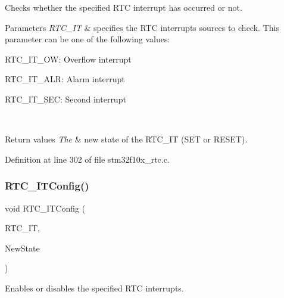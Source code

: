 Checks whether the specified R\+TC interrupt has occurred or not. 


\begin{DoxyParams}{Parameters}
{\em R\+T\+C\+\_\+\+IT} & specifies the R\+TC interrupts sources to check. This parameter can be one of the following values\+: \begin{DoxyItemize}
\item R\+T\+C\+\_\+\+I\+T\+\_\+\+OW\+: Overflow interrupt \item R\+T\+C\+\_\+\+I\+T\+\_\+\+A\+LR\+: Alarm interrupt \item R\+T\+C\+\_\+\+I\+T\+\_\+\+S\+EC\+: Second interrupt \end{DoxyItemize}
\\
\hline
\end{DoxyParams}

\begin{DoxyRetVals}{Return values}
{\em The} & new state of the R\+T\+C\+\_\+\+IT (S\+ET or R\+E\+S\+ET). \\
\hline
\end{DoxyRetVals}


Definition at line 302 of file stm32f10x\+\_\+rtc.\+c.

\mbox{\label{group___r_t_c___private___functions_ga175dfe88866234730c1ec40d2221c4f4}} 
\subsubsection{\texorpdfstring{R\+T\+C\+\_\+\+I\+T\+Config()}{RTC\_ITConfig()}}
{\footnotesize\ttfamily void R\+T\+C\+\_\+\+I\+T\+Config (\begin{DoxyParamCaption}\item[{uint16\+\_\+t}]{R\+T\+C\+\_\+\+IT,  }\item[{\hyperlink{group___exported__types_gac9a7e9a35d2513ec15c3b537aaa4fba1}{Functional\+State}}]{New\+State }\end{DoxyParamCaption})}



Enables or disables the specified R\+TC interrupts. 


